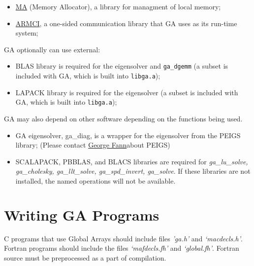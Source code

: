 \begin{itemize}

\item \href{http://www.emsl.pnl.gov/docs/parsoft/ma/MAapi.html}{MA} (Memory
Allocator), a library for managment of local memory; 

\item \href{http://www.emsl.pnl.gov/docs/parsoft/armci}{ARMCI}, a one-sided
communication library that GA uses as its run-time system; 

\end{itemize}

GA optionally can use external: 

\begin{itemize}

\item BLAS library is required for the eigensolver and \texttt{ga\_dgemm}
(a subset is included with GA, which is built into \texttt{libga.a});

\item LAPACK library is required for the eigensolver (a subset is included
with GA, which is built into \texttt{libga.a}); 

\end{itemize}

GA may also depend on other software depending on the functions being
used.

\begin{itemize}

\item GA eigensolver, ga\_diag, is a wrapper for the eigensolver from the
PEIGS library; (Please contact \href{mailto:fanngi@ornl.gov}{George Fann}about
PEIGS) 

\item SCALAPACK, PBBLAS, and BLACS libraries are required for \emph{ga\_lu\_solve,
ga\_cholesky, ga\_llt\_solve, ga\_spd\_invert, ga\_solve}. If these
libraries are not installed, the named operations will not be available. 

\end{itemize}

\section{Writing GA Programs}

C programs that use Global Arrays should include files \emph{'ga.h'} and
\emph{`macdecls.h'}. Fortran programs should include the files
\emph{`mafdecls.fh'} and \emph{`global.fh'}. Fortran source must be
preprocessed as a part of compilation.

